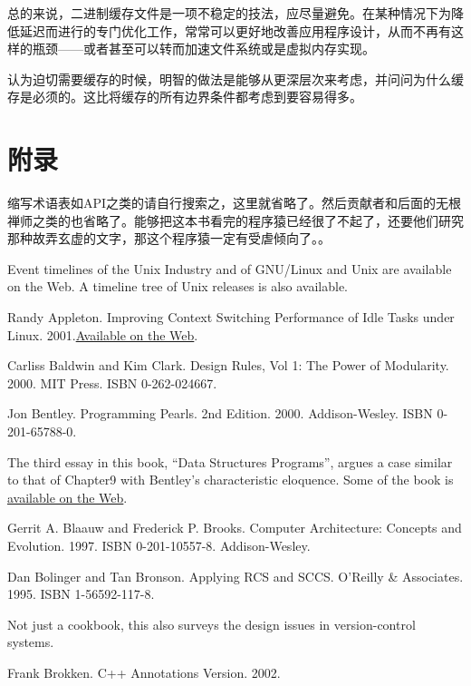 \documentclass[12pt,oneside]{book}
\begin{document}
\begin{common-format}
总的来说，二进制缓存文件是一项不稳定的技法，应尽量避免。在某种情况下为降低延迟而进行的专门优化工作，常常可以更好地改善应用程序设计，从而不再有这样的瓶颈——或者甚至可以转而加速文件系统或是虚拟内存实现。

认为迫切需要缓存的时候，明智的做法是能够从更深层次来考虑，并问问为什么缓存是必须的。这比将缓存的所有边界条件都考虑到要容易得多。



\chapter{附录}
缩写术语表如API之类的请自行搜索之，这里就省略了。然后贡献者和后面的无根禅师之类的也省略了。能够把这本书看完的程序猿已经很了不起了，还要他们研究那种故弄玄虚的文字，那这个程序猿一定有受虐倾向了。。

\backmatter
{}

Event timelines of the Unix Industry and of GNU/Linux and Unix are available on the Web. A timeline tree of Unix releases is also available.

\begin{thebibliography}{9}
 Randy Appleton. Improving Context Switching Performance of Idle Tasks under Linux. 2001.\href{http://euclid.nmu.edu/~randy/Research/Papers/Scheduler/}{Available on the Web}.

 Carliss Baldwin and Kim Clark. Design Rules, Vol 1: The Power of Modularity. 2000. MIT Press. ISBN 0-262-024667.

 Jon Bentley. Programming Pearls. 2nd Edition. 2000. Addison-Wesley. ISBN 0-201-65788-0.

The third essay in this book, “Data Structures Programs”, argues a case similar to that of Chapter9 with Bentley's characteristic eloquence. Some of the book is \href{http://www.cs.bell-labs.com/cm/cs/pearls/}{available on the Web}.

 Gerrit A. Blaauw and Frederick P. Brooks. Computer Architecture: Concepts and Evolution. 1997. ISBN 0-201-10557-8. Addison-Wesley.

 Dan Bolinger and Tan Bronson. Applying RCS and SCCS. O'Reilly \&{} Associates. 1995. ISBN 1-56592-117-8.

Not just a cookbook, this also surveys the design issues in version-control systems.

 Frank Brokken. C++ Annotations Version. 2002.


\end{thebibliography}
\end{common-format}
\end{document}
